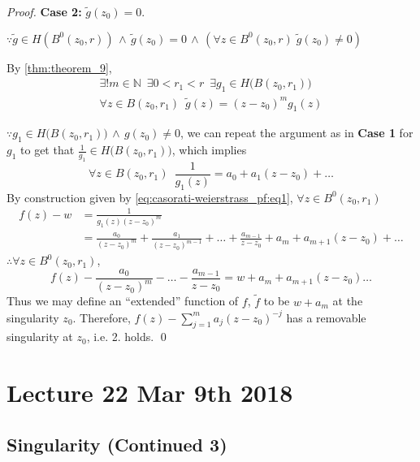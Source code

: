 \documentclass[notoc,notitlepage]{tufte-book}
\begin{document}
\begin{proof}
	\textbf{Case 2:} $\tilde{g}(z_0) = 0$.

	$\because \tilde{g} \in H(B^0(z_0, r)) \, \land \, \tilde{g}(z_0) = 0 \, \land \, (\forall z \in B^0(z_0, r) \; \tilde{g}(z_0) \neq 0)$

	By \cref{thm:theorem_9}, 
	\begin{gather}
		\exists ! m \in \mathbb{N} \enspace \exists 0 < r_1 < r \enspace \exists g_1 \in H\big(B(z_0, r_1)\big) \nonumber \\
		\forall z \in B(z_0, r_1) \enspace \tilde{g}(z) = (z - z_0)^m g_1(z) \label{eq:casorati-weierstrass_pf:eq1}
	\end{gather}

	$\because g_1 \in H\big( B(z_0, r_1) \big) \, \land \, g(z_0) \neq 0$, we can repeat the argument as in \textbf{Case 1} for $g_1$ to get that $\frac{1}{g_1} \in H\big( B(z_0, r_1) \big)$, which implies
	\begin{equation*}
		\forall z \in B(z_0, r_1) \enspace \frac{1}{g_1(z)} = a_0 + a_1 (z - z_0) + \hdots
	\end{equation*}
	By construction given by \cref{eq:casorati-weierstrass_pf:eq1}, $\forall z \in B^0(z_0, r_1)$
	\begin{align*}
		f(z) - w
			&= \frac{1}{g_1(z) (z - z_0)^m} \\
			&= \frac{a_0}{(z - z_0)^m} + \frac{a_1}{(z - z_0)^{m - 1}} + \hdots + \frac{a_{m - 1}}{z - z_0} + a_m + a_{m + 1} (z - z_0) + \hdots 
	\end{align*}
	$\therefore \forall z \in B^0(z_0, r_1)$,
	\begin{equation*}
		f(z) - \frac{a_0}{(z - z_0)^m} - \hdots - \frac{a_{m - 1}}{z - z_0} = w + a_m + a_{m + 1}(z - z_0) \hdots 
	\end{equation*}
	Thus we may define an ``extended'' function of $f$, $\tilde{f}$ to be $w + a_m$ at the singularity $z_0$. Therefore, $f(z) - \sum_{j=1}^{m} a_j (z - z_0)^{-j}$ has a removable singularity at $z_0$, i.e. 2. holds. \qed
\end{proof}



\chapter{Lecture 22 Mar 9th 2018}
\label{chp:lecture_22_mar_9th_2018}

\section{Singularity (Continued 3)} %
\end{document}
